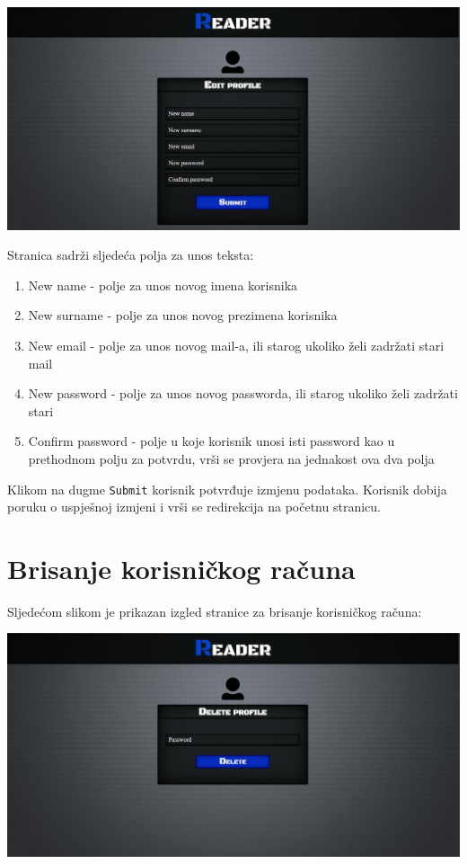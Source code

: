 \begin{center}
\includegraphics[scale=0.2]{images/ModifikacijaKorisnickihPodataka.png}
\end{center}

Stranica sadrži sljedeća polja za unos teksta:
\begin{enumerate}
\item New name - polje za unos novog imena korisnika
\item New surname - polje za unos novog prezimena korisnika
\item New email - polje za unos novog mail-a, ili starog ukoliko želi zadržati stari mail
\item New password - polje za unos novog passworda, ili starog ukoliko želi zadržati stari
\item Confirm password - polje u koje korisnik unosi isti password kao u prethodnom polju za potvrdu, vrši se provjera na jednakost ova dva polja
\end{enumerate}

Klikom na dugme \texttt{Submit} korisnik potvrđuje izmjenu podataka. Korisnik dobija poruku o uspješnoj izmjeni i vrši se redirekcija na početnu stranicu.

\newpage
\section{Brisanje korisničkog računa}

Sljedećom slikom je prikazan izgled stranice za brisanje korisničkog računa:

\begin{center}
\includegraphics[scale=0.2]{images/BrisanjeKorisnickogRacuna.png}
\end{center}

